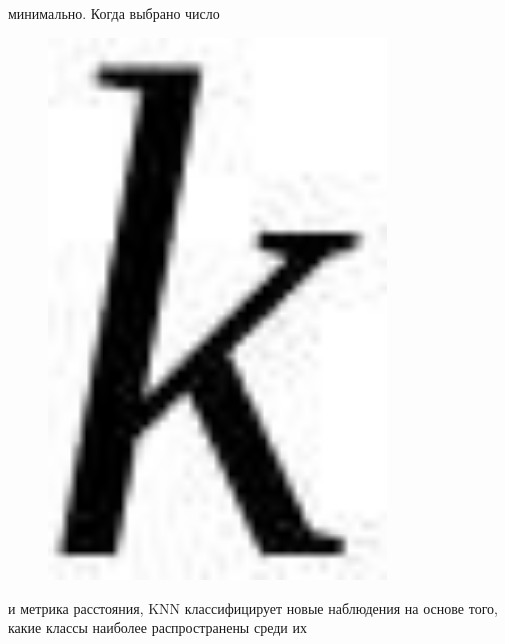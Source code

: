 минимально. Когда выбрано число \begin{figure}[H]
	\centering
	\includegraphics[width=0.8\textwidth]{assets/92}
	\caption*{}
\end{figure} и
метрика расстояния, KNN классифицирует новые наблюдения на основе того,
какие классы наиболее распространены среди их
